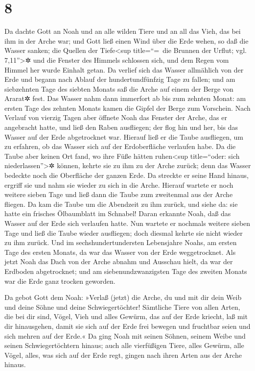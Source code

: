 \hypertarget{section-7}{%
\section{8}\label{section-7}}

 Da dachte Gott an Noah und an alle wilden Tiere und an
all das Vieh, das bei ihm in der Arche war; und Gott ließ einen Wind
über die Erde wehen, so daß die Wasser sanken;  die
Quellen der Tiefe\textless sup title=``=~die Brunnen der Urflut; vgl.
7,11''\textgreater✲ und die Fenster des Himmels schlossen sich, und dem
Regen vom Himmel her wurde Einhalt getan.  Da verlief sich
das Wasser allmählich von der Erde und begann nach Ablauf der
hundertundfünfzig Tage zu fallen;  und am siebzehnten Tage
des siebten Monats saß die Arche auf einem der Berge von Ararat✲ fest.
 Das Wasser nahm dann immerfort ab bis zum zehnten Monat:
am ersten Tage des zehnten Monats kamen die Gipfel der Berge zum
Vorschein.  Nach Verlauf von vierzig Tagen aber öffnete
Noah das Fenster der Arche, das er angebracht hatte,  und
ließ den Raben ausfliegen; der flog hin und her, bis das Wasser auf der
Erde abgetrocknet war.  Hierauf ließ er die Taube
ausfliegen, um zu erfahren, ob das Wasser sich auf der Erdoberfläche
verlaufen habe.  Da die Taube aber keinen Ort fand, wo
ihre Füße hätten ruhen\textless sup title=``oder: sich
niederlassen''\textgreater✲ können, kehrte sie zu ihm zu der Arche
zurück; denn das Wasser bedeckte noch die Oberfläche der ganzen Erde. Da
streckte er seine Hand hinaus, ergriff sie und nahm sie wieder zu sich
in die Arche.  Hierauf wartete er noch weitere sieben
Tage und ließ dann die Taube zum zweitenmal aus der Arche fliegen.
 Da kam die Taube um die Abendzeit zu ihm zurück, und
siehe da: sie hatte ein frisches Ölbaumblatt im Schnabel! Daran erkannte
Noah, daß das Wasser auf der Erde sich verlaufen hatte. 
Nun wartete er nochmals weitere sieben Tage und ließ die Taube wieder
ausfliegen; doch diesmal kehrte sie nicht wieder zu ihm zurück.
 Und im sechshundertundersten Lebensjahre Noahs, am
ersten Tage des ersten Monats, da war das Wasser von der Erde
weggetrocknet. Als jetzt Noah das Dach von der Arche abnahm und Ausschau
hielt, da war der Erdboden abgetrocknet;  und am
siebenundzwanzigsten Tage des zweiten Monats war die Erde ganz trocken
geworden.

 Da gebot Gott dem Noah:  »Verlaß (jetzt)
die Arche, du und mit dir dein Weib und deine Söhne und deine
Schwiegertöchter!  Sämtliche Tiere von allen Arten, die
bei dir sind, Vögel, Vieh und alles Gewürm, das auf der Erde kriecht,
laß mit dir hinausgehen, damit sie sich auf der Erde frei bewegen und
fruchtbar seien und sich mehren auf der Erde.«  Da ging
Noah mit seinen Söhnen, seinem Weibe und seinen Schwiegertöchtern
hinaus;  auch alle vierfüßigen Tiere, alles Gewürm, alle
Vögel, alles, was sich auf der Erde regt, gingen nach ihren Arten aus
der Arche hinaus.

